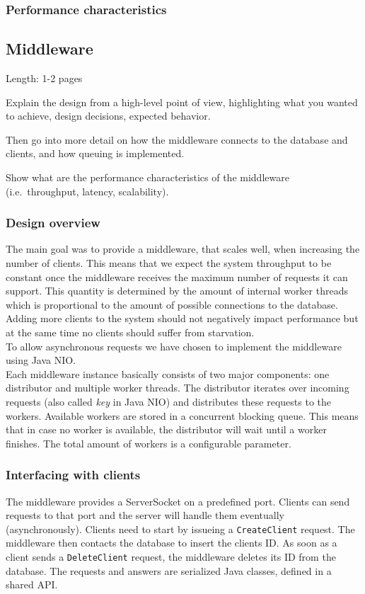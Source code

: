 \documentclass[11pt]{article}
\begin{document}
\subsubsection{Performance characteristics}\label{sec:performance-characteristics}

\subsection{Middleware}\label{sec:middleware}

Length: 1-2 pages

Explain the design from a high-level point of view, highlighting what
you wanted to achieve, design decisions, expected behavior.

Then go into more detail on how the middleware connects to the database
and clients, and how queuing is implemented.

Show what are the performance characteristics of the middleware
(i.e.~throughput, latency, scalability).

\subsubsection{Design overview}\label{sec:design-overview}
The main goal was to provide a middleware, that scales well, when increasing the number of clients. This means that we expect the system throughput to be constant once the middleware receives the maximum number of requests it can support. This quantity is determined by the amount of internal worker threads which is proportional to the amount of possible connections to the database.
Adding more clients to the system should not negatively impact performance but at the same time no clients should suffer from starvation.
\\
To allow asynchronous requests we have chosen to implement the middleware using Java NIO.
\\
Each middleware instance basically consists of two major components: one distributor and multiple worker threads.
The distributor iterates over incoming requests (also called \textit{key} in Java NIO) and distributes these requests to the workers. Available workers are stored in a concurrent blocking queue. This means that in case no worker is available, the distributor will wait until a worker finishes. The total amount of workers is a configurable parameter.



\subsubsection{Interfacing with clients}\label{sec:interfacing-with-clients}
The middleware provides a ServerSocket on a predefined port. Clients can send requests to that port and the server will handle them eventually (asynchronously).
Clients need to start by issueing a \texttt{CreateClient} request. The middleware then contacts the database to insert the clients ID. As soon as a client sends a \texttt{DeleteClient} request, the middleware deletes its ID from the database.
The requests and answers are serialized Java classes, defined in a shared API.
\end{document}
